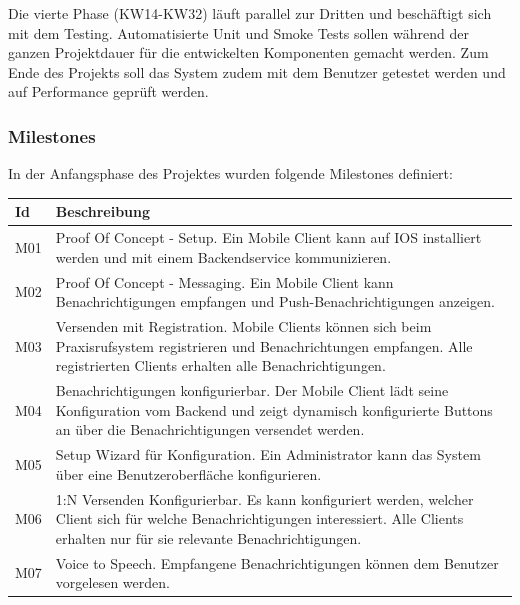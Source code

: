 Die vierte Phase (KW14-KW32) läuft parallel zur Dritten und beschäftigt sich mit dem Testing.
Automatisierte Unit und Smoke Tests sollen während der ganzen Projektdauer für die entwickelten Komponenten gemacht werden.
Zum Ende des Projekts soll das System zudem mit dem Benutzer getestet werden und auf Performance geprüft werden.

\clearpage
\subsubsection{Milestones}

In der Anfangsphase des Projektes wurden folgende Milestones definiert:

\begin{table}[h]
    \centering
    \begin{tabular}{|l|p{15cm}|}
        \hline
        \textbf{Id} & \textbf{Beschreibung}                                                                                                                                                                                         \\
        \hline
        M01         & Proof Of Concept - Setup. Ein Mobile Client kann auf IOS installiert werden und mit einem Backendservice kommunizieren. \\
        \hline
        M02         & Proof Of Concept - Messaging. Ein Mobile Client kann Benachrichtigungen empfangen und Push-Benachrichtigungen anzeigen. \\
        \hline
        M03         & Versenden mit Registration. Mobile Clients können sich beim Praxisrufsystem registrieren und Benachrichtungen empfangen. Alle registrierten Clients erhalten alle Benachrichtigungen. \\
        \hline
        M04         & Benachrichtigungen konfigurierbar. Der Mobile Client lädt seine Konfiguration vom Backend und zeigt dynamisch konfigurierte Buttons an über die Benachrichtigungen versendet werden.\\
        \hline
        M05         & Setup Wizard für Konfiguration. Ein Administrator kann das System über eine Benutzeroberfläche konfigurieren.  \\
        \hline
        M06         & 1:N Versenden Konfigurierbar. Es kann konfiguriert werden, welcher Client sich für welche Benachrichtigungen interessiert. Alle Clients erhalten nur für sie relevante Benachrichtigungen.  \\
        \hline
        M07         & Voice to Speech. Empfangene Benachrichtigungen können dem Benutzer vorgelesen werden. \\

\end{tabular}
\end{table}
